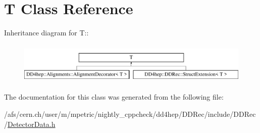 \hypertarget{class_t}{
\section{T Class Reference}
\label{class_t}
}
Inheritance diagram for T::\begin{figure}[H]
\begin{center}
\leavevmode
\includegraphics[height=1.98582cm]{class_t}
\end{center}
\end{figure}


The documentation for this class was generated from the following file:\begin{DoxyCompactItemize}
\item 
/afs/cern.ch/user/m/mpetric/nightly\_\-cppcheck/dd4hep/DDRec/include/DDRec/\hyperlink{_detector_data_8h}{DetectorData.h}\end{DoxyCompactItemize}

